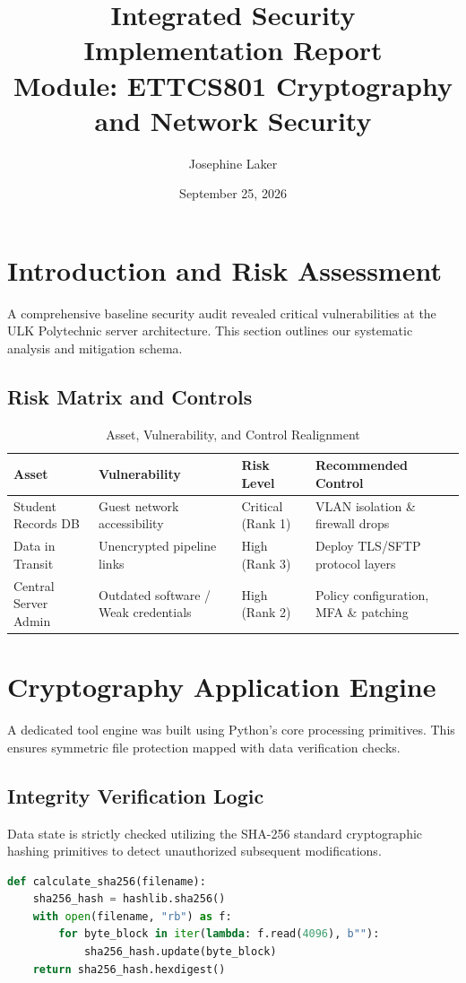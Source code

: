 \documentclass[12pt,a4paper]{article}
\title{Integrated Security Implementation Report \\ \large Module: ETTCS801 Cryptography and Network Security}
\author{Josephine Laker}
\date{September 25, 2026}
\begin{document}
\maketitle
\tableofcontents
\newpage

\section{Introduction and Risk Assessment}
A comprehensive baseline security audit revealed critical vulnerabilities at the ULK Polytechnic server architecture. This section outlines our systematic analysis and mitigation schema.

\subsection{Risk Matrix and Controls}
\begin{table}[h!]
\small
\centering
\caption{Asset, Vulnerability, and Control Realignment}
\begin{tabular}{p{3.5cm}p{4cm}p{3cm}p{4.5cm}}
\toprule
\textbf{Asset} & \textbf{Vulnerability} & \textbf{Risk Level} & \textbf{Recommended Control} \\
\midrule
Student Records DB & Guest network accessibility & Critical (Rank 1) & VLAN isolation \& firewall drops \\
Data in Transit & Unencrypted pipeline links & High (Rank 3) & Deploy TLS/SFTP protocol layers \\
Central Server Admin & Outdated software / Weak credentials & High (Rank 2) & Policy configuration, MFA \& patching \\
\bottomrule
\end{tabular}
\end{table}

\section{Cryptography Application Engine}
A dedicated tool engine was built using Python's core processing primitives. This ensures symmetric file protection mapped with data verification checks.

\subsection{Integrity Verification Logic}
Data state is strictly checked utilizing the SHA-256 standard cryptographic hashing primitives to detect unauthorized subsequent modifications.
\begin{lstlisting}[language=Python, caption=SHA-256 Verification Extraction Block]
def calculate_sha256(filename):
    sha256_hash = hashlib.sha256()
    with open(filename, "rb") as f:
        for byte_block in iter(lambda: f.read(4096), b""):
            sha256_hash.update(byte_block)
    return sha256_hash.hexdigest()
\end{lstlisting}
\end{document}
